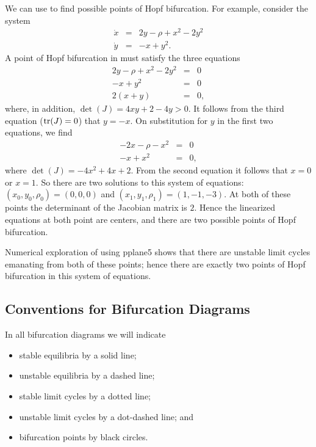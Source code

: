 \documentclass{ximera}
\begin{document}
We can use  to find possible points of Hopf bifurcation.  For 
example, consider the system
\begin{equation*}  \label{E:hopfdetect}
\begin{array}{rcl}
\dot{x} & = & 2y - \rho + x^2 - 2y^2\\
\dot{y} & = & -x + y^2.
\end{array}
\end{equation*}
A point of Hopf bifurcation in  must satisfy the three 
equations
\[
\begin{array}{rcl}
2y - \rho  + x^2 - 2y^2 & = & 0\\
-x + y^2 & = & 0 \\
2(x + y)  & = & 0,
\end{array}
\]
where, in addition, $\det(J) = 4xy+2-4y>0$.  It follows from the third 
equation (${\rm tr}(J)=0$) that $y=-x$.  On substitution for $y$ in the first 
two equations, we find
\[
\begin{array}{rcl}
-2x - \rho - x^2 & = & 0\\
-x + x^2 & = & 0,
\end{array}
\]
where $\det(J) = -4x^2+4x+2$.  From the second equation it follows that $x=0$
or $x=1$.  So there are two solutions to this system of equations: 
$(x_0,y_0,\rho_0)=(0,0,0)$ and $(x_1,y_1,\rho_1)=(1,-1,-3)$.  At both of
these points the determinant of the Jacobian matrix is $2$.  Hence the
linearized equations at both point are centers, and there are two possible
points of Hopf bifurcation.

Numerical exploration of  using {\sf pplane5} shows that 
there are unstable limit cycles emanating from both of these points; hence 
there are exactly two points of Hopf bifurcation in this system of equations.



\subsection*{Conventions for Bifurcation Diagrams}

In all bifurcation diagrams we will indicate
\begin{itemize}
\item	stable equilibria by a solid line;
\item	unstable equilibria by a dashed line;
\item	stable limit cycles by a dotted line;
\item	unstable limit cycles by a dot-dashed line; and
\item	bifurcation points by black circles.
\end{itemize}
\end{document}
